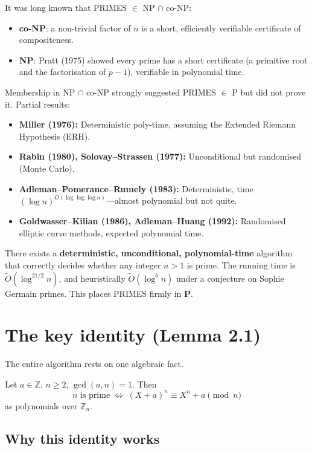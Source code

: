 \documentclass[12pt]{article}
\newcommand{\Z}{\mathbb{Z}}
\newcommand{\OO}{\widetilde{O}}
\begin{document}
It was long known that PRIMES $\in$ NP $\cap$ co-NP:
\begin{itemize}
  \item \textbf{co-NP}: a non-trivial factor of $n$ is a short, efficiently verifiable certificate of compositeness.
  \item \textbf{NP}: Pratt (1975) showed every prime has a short certificate (a primitive root and the factorisation of $p-1$), verifiable in polynomial time.
\end{itemize}
Membership in NP $\cap$ co-NP strongly suggested PRIMES $\in$ P but did not prove it. Partial results:
\begin{itemize}
  \item \textbf{Miller (1976):} Deterministic poly-time, assuming the Extended Riemann Hypothesis (ERH).
  \item \textbf{Rabin (1980), Solovay--Strassen (1977):} Unconditional but randomised (Monte Carlo).
  \item \textbf{Adleman--Pomerance--Rumely (1983):} Deterministic, time $(\log n)^{O(\log\log\log n)}$---almost polynomial but not quite.
  \item \textbf{Goldwasser--Kilian (1986), Adleman--Huang (1992):} Randomised elliptic curve methods, expected polynomial time.
\end{itemize}

\begin{thmbox}
There exists a \textbf{deterministic, unconditional, polynomial-time} algorithm that correctly decides whether any integer $n>1$ is prime. The running time is $\OO(\log^{21/2} n)$, and heuristically $\OO(\log^6 n)$ under a conjecture on Sophie Germain primes. This places PRIMES firmly in \textbf{P}.
\end{thmbox}

\section{The key identity (Lemma 2.1)}

The entire algorithm rests on one algebraic fact.

\begin{thmbox}[Lemma 2.1]
Let $a \in \Z$, $n \geq 2$, $\gcd(a,n)=1$. Then
\[
  n \text{ is prime} \;\iff\; (X+a)^n \equiv X^n + a \pmod{n}
\]
as polynomials over $\Z_n$.
\end{thmbox}

\subsection{Why this identity works}
\end{document}
